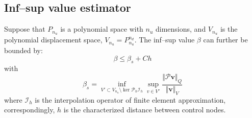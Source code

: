 \subsection{Inf--sup value estimator}


\begin{thm}
    Suppose that $P_{n_u}$ is a polynomial space with $n_u$ dimensions, and $V_{n_u}$ is the polynomial displacement space, $V_{n_u} = P_{n_u}^{n_d}$. The inf--sup value $\beta$ can further be bounded by:
    \begin{equation}\label{estimator}
        \beta \le \beta_s + Ch 
    \end{equation}
    with
    \begin{equation}\label{beta_s}
        \beta_s = 
        \inf_{V' \subset V_{n_u} \setminus \ker \mathcal P_h \mathcal I_h} \sup_{v \in V'} \frac{\Vert \mathcal P \boldsymbol v \Vert_Q}{\Vert \boldsymbol v \Vert_V}
    \end{equation}
where $\mathcal I_h$ is the interpolation operator of finite element approximation, correspondingly, $h$ is the characterized distance between control nodes.

\end{thm}

